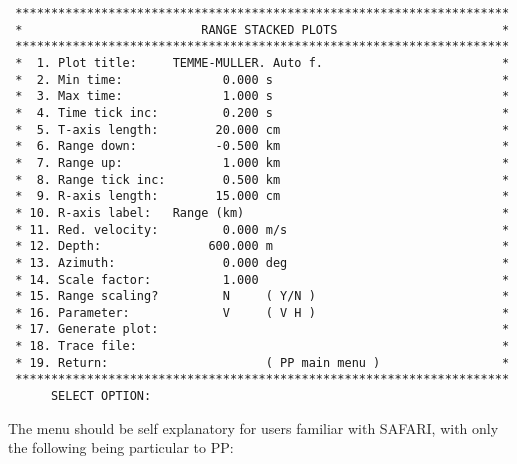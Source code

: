 \small
\begin{verbatim}
 *********************************************************************
 *                         RANGE STACKED PLOTS                       *
 *********************************************************************
 *  1. Plot title:     TEMME-MULLER. Auto f.                         *
 *  2. Min time:              0.000 s                                *
 *  3. Max time:              1.000 s                                *
 *  4. Time tick inc:         0.200 s                                *
 *  5. T-axis length:        20.000 cm                               *
 *  6. Range down:           -0.500 km                               *
 *  7. Range up:              1.000 km                               *
 *  8. Range tick inc:        0.500 km                               *
 *  9. R-axis length:        15.000 cm                               *
 * 10. R-axis label:   Range (km)                                    *
 * 11. Red. velocity:         0.000 m/s                              *
 * 12. Depth:               600.000 m                                *
 * 13. Azimuth:               0.000 deg                              *
 * 14. Scale factor:          1.000                                  *
 * 15. Range scaling?         N     ( Y/N )                          *
 * 16. Parameter:             V     ( V H )                          *
 * 17. Generate plot:                                                *
 * 18. Trace file:                                                   *
 * 19. Return:                      ( PP main menu )                 *
 *********************************************************************
      SELECT OPTION: 
\end{verbatim}
\normalsize 
    The  menu should be self explanatory for users familiar  with 
SAFARI, with only the following being particular to PP: 
